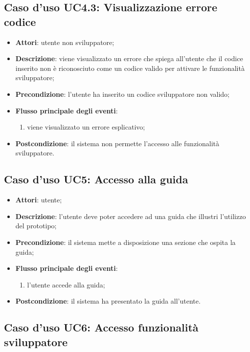 \documentclass[../AnalisiDeiRequisiti.tex]{subfiles}
\begin{document}
\subsection{Caso d'uso UC4.3: Visualizzazione errore codice}
\begin{itemize}
\item \textbf{Attori}: utente non sviluppatore;
\item \textbf{Descrizione}: viene visualizzato un errore che spiega all'utente che il codice inserito non è riconosciuto come un codice valido per attivare le funzionalità sviluppatore; 
      \item \textbf{Precondizione}: l'utente ha inserito un codice sviluppatore non valido;

        \item \textbf{Flusso principale degli eventi}:
          \begin{enumerate}
          \item viene visualizzato un errore esplicativo;
      \end{enumerate}
    \item \textbf{Postcondizione}: il sistema non permette l'accesso alle funzionalità sviluppatore.
  \end{itemize}
\hypertarget{UC5}{}
\subsection{Caso d'uso UC5: Accesso alla guida}
\begin{itemize}
\item \textbf{Attori}: utente;
\item \textbf{Descrizione}: l'utente deve poter accedere ad una guida che illustri l'utilizzo del prototipo; 
      \item \textbf{Precondizione}: il sistema mette a disposizione una sezione che ospita la guida;

        \item \textbf{Flusso principale degli eventi}:
          \begin{enumerate}
          \item l'utente accede alla guida;

      \end{enumerate}
    \item \textbf{Postcondizione}: il sistema ha presentato la guida all'utente.
  \end{itemize}
\hypertarget{UC6}{}
\subsection{Caso d'uso UC6: Accesso funzionalità sviluppatore}
\end{document}
